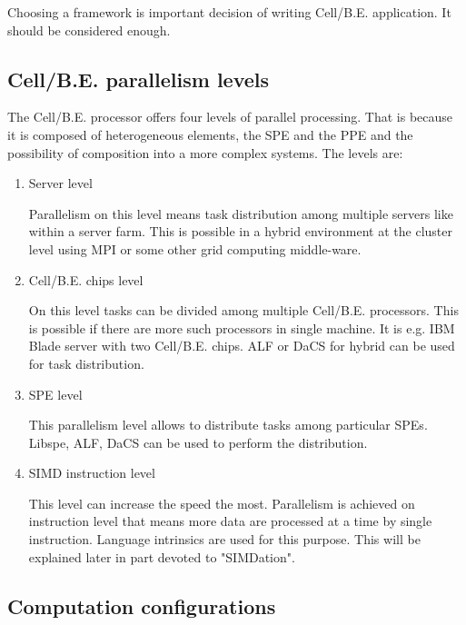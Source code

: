 Choosing a framework is important decision of writing \mbox{Cell/B.E.} application.
It should be considered enough.

\subsection {\mbox{Cell/B.E.} parallelism levels}

The \mbox{Cell/B.E.} processor offers four levels of parallel processing.
That is because it is composed of heterogeneous elements, the SPE and the PPE and the possibility of composition into a more complex systems.
The levels are:
\begin{enumerate}
\item Server level
\par
Parallelism on this level means task distribution among multiple servers like within a server farm.
This is possible in a hybrid environment at the cluster level using MPI or some other grid computing middle-ware.

\item \mbox{Cell/B.E.} chips level
\par
On this level tasks can be divided among multiple \mbox{Cell/B.E.} processors.
This is possible if there are more such processors in single machine.
It is e.g. IBM Blade server with two \mbox{Cell/B.E.} chips.
ALF or DaCS for hybrid can be used for task distribution.

\item SPE level
\par
This parallelism level allows to distribute tasks among particular SPEs.
Libspe, ALF, DaCS can be used to perform the distribution.

\item SIMD instruction level
\par
This level can increase the speed the most.
Parallelism is achieved on instruction level that means more data are processed at a time by single instruction.
Language intrinsics are used for this purpose.
This will be explained later in part devoted to "SIMDation".
\end{enumerate}

\subsection{Computation configurations}

